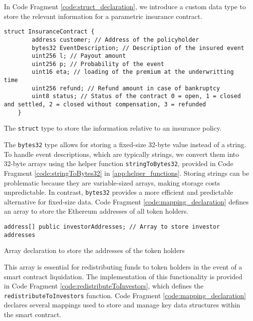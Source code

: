 \documentclass[10pt]{article}
\begin{document}
In Code Fragment \ref{code:struct_declaration}, we introduce a custom data type to store the relevant information for a parametric insurance contract.
\begin{codefragment}[!h]
\begin{lstlisting}[language=Solidity]
struct InsuranceContract {
        address customer; // Address of the policyholder
        bytes32 EventDescription; // Description of the insured event
        uint256 l; // Payout amount
        uint256 p; // Probability of the event
        uint16 eta; // loading of the premium at the underwritting time
        uint256 refund; // Refund amount in case of bankruptcy
        uint8 status; // Status of the contract 0 = open, 1 = closed and settled, 2 = closed without compensation, 3 = refunded
    }
\end{lstlisting}
    \caption{The \texttt{struct} type to store the information relative to an insurance policy.}
    \label{code:struct_declaration}
\end{codefragment}
The \texttt{bytes32} type allows for storing a fixed-size 32-byte value instead of a string. To handle event descriptions, which are typically strings, we convert them into 32-byte arrays using the helper function \texttt{stringToBytes32}, provided in Code Fragment \ref{code:stringToBytes32} in \cref{app:helper_functions}. Storing strings can be problematic because they are variable-sized arrays, making storage costs unpredictable. In contrast, \texttt{bytes32} provides a more efficient and predictable alternative for fixed-size data. Code Fragment \ref{code:mapping_declaration} defines an array to store the Ethereum addresses of all token holders.

\begin{codefragment}[!h]
\begin{lstlisting}[language=Solidity]
    address[] public investorAddresses; // Array to store investor addresses
\end{lstlisting}
    \caption{Array declaration to store the addresses of the token holders}
    \label{code:array_declaration}
\end{codefragment}

This array is essential for redistributing funds to token holders in the event of a smart contract liquidation. The implementation of this functionality is provided in Code Fragment \ref{code:redistributeToInvestors}, which defines the \texttt{redistributeToInvestors} function. Code Fragment \ref{code:mapping_declaration} declares several mappings used to store and manage key data structures within the smart contract.
\end{document}
